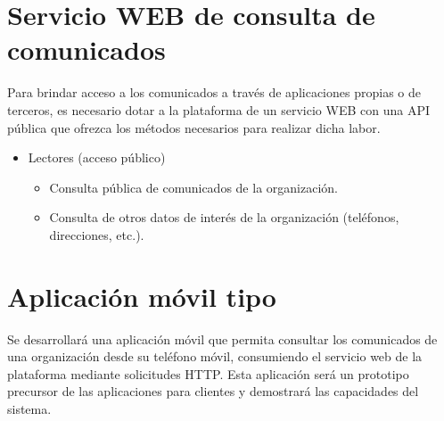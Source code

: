 \section{Servicio WEB de consulta de comunicados}
Para brindar acceso a los comunicados a través de aplicaciones propias o de terceros, es necesario dotar a la plataforma de un servicio WEB con una API pública que ofrezca los métodos necesarios para realizar dicha labor.
\begin{itemize}
    \item Lectores (acceso público)
    \begin{itemize}
        \item Consulta pública de comunicados de la organización.
        \item Consulta de otros datos de interés de la organización (teléfonos, direcciones, etc.).
    \end{itemize}
\end{itemize}

\section{Aplicación móvil tipo}
Se desarrollará una aplicación móvil que permita consultar los comunicados de una organización desde su teléfono móvil, consumiendo el servicio web de la plataforma mediante solicitudes HTTP. Esta aplicación será un prototipo precursor de las aplicaciones para clientes y demostrará las capacidades del sistema.